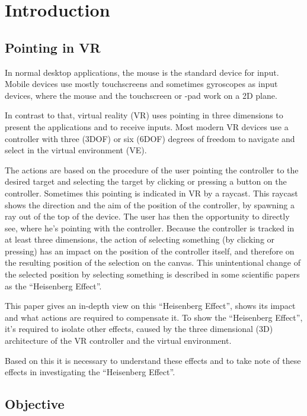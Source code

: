 \chapter{Introduction}
\label{ch:introduction}

\section{Pointing in VR}

In normal desktop applications, the mouse is the standard device for input. Mobile devices use mostly touchscreens and sometimes gyroscopes as input devices, where the mouse and the touchscreen or -pad work on a 2D plane. 

In contrast to that, virtual reality (VR) uses pointing in three dimensions to present the applications and to receive inputs. Most modern VR devices use a controller with three (3DOF) or six (6DOF) degrees of freedom to navigate and select in the virtual environment (VE). 

The actions are based on the procedure of the user pointing the controller to the desired target and selecting the target by clicking or pressing a button on the controller. Sometimes this pointing is indicated in VR by a raycast. This raycast shows the direction and the aim of the position of the controller, by spawning a ray out of the top of the device. The user has then the opportunity to directly see, where he's pointing with the controller. Because the controller is tracked in at least three dimensions, the action of selecting something (by clicking or pressing) has an impact on the position of the controller itself, and therefore on the resulting position of the selection on the canvas. This unintentional change of the selected position by selecting something is described in some scientific papers as the ``Heisenberg Effect''.

This paper gives an in-depth view on this ``Heisenberg Effect'', shows its impact and what actions are required to compensate it. To show the ``Heisenberg Effect'', it's required to isolate other effects, caused by the three dimensional (3D) architecture of the VR controller and the virtual environment. 

Based on this it is necessary to understand these effects and to take note of these effects in investigating the ``Heisenberg Effect''.

\section{Objective}

